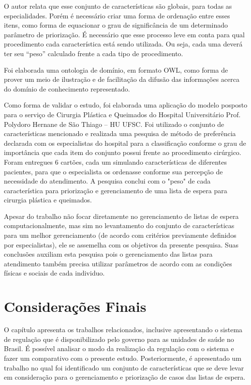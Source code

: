 
O autor relata que esse conjunto de características são globais, para todas as especialidades. Porém é necessário criar uma forma de ordenação entre esses itens, como forma de equacionar o grau de significância de um determinado parâmetro de priorização. É necessário que esse processo leve
em conta para qual procedimento cada característica está sendo utilizada. Ou seja, cada uma deverá ter seu “peso” calculado frente a cada tipo de procedimento.

Foi elaborada uma ontologia de domínio, em formato OWL, como forma de prover um meio de ilustração e de facilitação da difusão das informações acerca do domínio de conhecimento representado.

Como forma de validar o estudo, foi elaborada uma aplicação do modelo posposto para o serviço de Cirurgia Plástica e Queimados do Hospital Universitário Prof. Polydoro Hernane de São Thiago – HU UFSC. Foi utilizado o conjunto de características mencionado e realizada uma pesquisa de método de preferência declarada com os especialistas do hospital para a classificação conforme o grau de importância que cada item do conjunto possui frente ao procedimento cirúrgico.
Foram entregues 6 cartões, cada um simulando características de diferentes pacientes, para que o especialista os ordenasse conforme sua percepção de necessidade do atendimento. A pesquisa conclui com o "peso" de cada característica para priorização e gerenciamento de uma lista de espera para cirurgia plástica e queimados.

Apesar do trabalho não focar diretamente no gerenciamento de listas de espera computacionalmente, mas sim no levantamento do conjunto de características para um melhor gerenciamento (de acordo com critérios previamente definidos por especialistas), ele se assemelha com os objetivos da presente pesquisa. Suas conclusões auxiliam esta pesquisa pois o gerenciamento das listas para atendimento também precisa utilizar parâmetros de acordo com as condições físicas e sociais de cada individuo.



\section{Considerações Finais}

    O capítulo apresenta os trabalhos relacionados, inclusive apresentando o sistema de regulação que é disponibilizado pelo governo para as unidades de saúde no Brasil. É possível analisar o modo da realização da regulação com o sistema e fazer um comparativo com o presente estudo. Posteriormente, é apresentado um trabalho no qual foi identificado um conjunto de características que se deve levar em consideração para o gerenciamento e priorização de casos das listas de espera.
    
